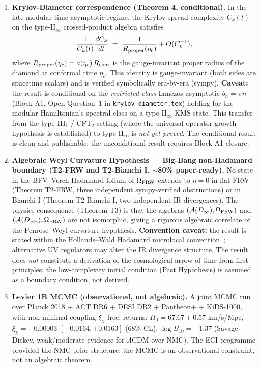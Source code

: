 \begin{enumerate}
\item \textbf{Krylov-Diameter correspondence (Theorem 4, conditional).}
  In the late-modular-time asymptotic regime, the Krylov spread complexity
  $C_k(t)$ on the type-II$_\infty$ crossed-product algebra satisfies
  \begin{equation}
    \frac{1}{C_k(t)}\frac{dC_k}{dt} \;=\; \frac{1}{R_{\rm proper}(\eta_c)}
    + O(C_k^{-1}),
    \label{eq:krylov_rate}
  \end{equation}
  where $R_{\rm proper}(\eta_c) = a(\eta_c)\,R_{\rm conf}$ is the gauge-invariant
  proper radius of the diamond at conformal time $\eta_c$.  This identity is
  gauge-invariant (both sides are spacetime scalars) and is verified
  symbolically era-by-era (sympy).
  \textbf{Caveat:} the result is conditional on the \emph{restricted-class}
  Lanczos asymptotic $b_n = \pi n$ (Block A1, Open Question~1 in
  \texttt{krylov\_diameter.tex}) holding for the modular Hamiltonian's
  spectral class on a type-II$_\infty$ KMS state.  This transfer from the
  type-III$_1$ / CFT$_2$ setting (where the universal operator-growth
  hypothesis is established) to type-II$_\infty$ is \emph{not yet proved}.
  The conditional result is clean and publishable; the unconditional result
  requires Block A1 closure.

\item \textbf{Algebraic Weyl Curvature Hypothesis — Big-Bang
  non-Hadamard boundary (T2-FRW and T2-Bianchi I, $\sim$80\%
  paper-ready).}
  No state in the BFV--Verch Hadamard folium of $\Omega_{\rm FRW}$ extends
  to $\eta = 0$ in flat FRW (Theorem T2-FRW, three independent
  sympy-verified obstructions) or in Bianchi I (Theorem T2-Bianchi I, two
  independent IR divergences).  The physics consequence (Theorem T3) is that
  the algebras $({\mathcal A}(D_\infty), \Omega_{\rm FRW})$ and
  $(\mathcal{A}(D_{\rm BB}), \Omega_{\rm FRW})$ are not isomorphic, giving a
  rigorous algebraic correlate of the Penrose--Weyl curvature hypothesis.
  \textbf{Convention caveat:} the result is stated within the Hollands--Wald
  Hadamard microlocal convention~\cite{HollandsWald2001,BFV2003};
  alternative UV regulators may alter the IR divergence structure.
  The result does \emph{not} constitute a derivation of the
  cosmological arrow of time from first principles: the low-complexity
  initial condition (Past Hypothesis) is assumed as a boundary condition,
  not derived.

\item \textbf{Levier 1B MCMC (observational, not algebraic).}
  A joint MCMC run over Planck 2018 + ACT DR6 + DESI DR2 + Pantheon+ +
  KiDS-1000, with non-minimal coupling $\xi_\chi$ free, returns:
  $H_0 = 67.67 \pm 0.57$ km/s/Mpc, $\xi_\chi = -0.00003$
  $[-0.0164, +0.0163]$ (68\% CL), $\log B_{10} = -1.37$ (Savage--Dickey,
  weak/moderate evidence for $\Lambda$CDM over NMC).
  The ECI programme provided the NMC prior structure; the MCMC is an
  observational constraint, not an algebraic theorem.

\end{enumerate}

